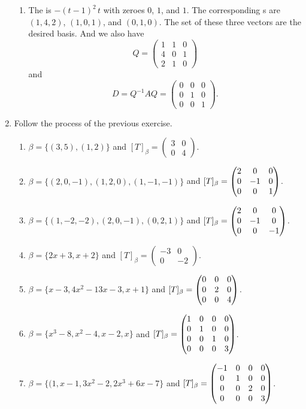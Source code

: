 \begin{enumerate}
\begin{enumerate}
\item The \charpoly{} is $-{\left( t-1\right) }^{2}\,t$ with zeroes $0$, $1$, and $1$. The corresponding \egve s are $(1,4,2)$, $(1,0,1)$, and $(0,1,0)$. The set of these three vectors are the desired basis. And we also have 
\[Q=\begin{pmatrix}1&1&0\\4&0&1\\2&1&0\end{pmatrix}\]
and 
\[D=Q^{-1}AQ=\begin{pmatrix}0&0&0\\0&1&0\\0&0&1\end{pmatrix}.\]
\end{enumerate}
\item Follow the process of the previous exercise.
\begin{enumerate}
\item $\beta =\{(3,5),(1,2)\}$ and $[T]_{\beta }=\begin{pmatrix}3&0\\0&4\end{pmatrix}$.
\item $\beta =\{(2,0,-1),(1,2,0),(1,-1,-1)\}$ and $[T]_{\beta }=\begin{pmatrix}2 & 0 & 0\cr 0 & -1 & 0\cr 0 & 0 & 1\end{pmatrix}$.
\item $\beta =\{(1,-2,-2),(2,0,-1),(0,2,1)\}$ and $[T]_{\beta }=\begin{pmatrix}2 & 0 & 0\cr 0 & -1 & 0\cr 0 & 0 & -1\end{pmatrix}$.
\item $\beta =\{2x+3,x+2\}$ and $[T]_{\beta }=\begin{pmatrix}-3&0\\0&-2\end{pmatrix}$.
\item $\beta =\{x-3,4x^2-13x-3,x+1\}$ and $[T]_{\beta }=\begin{pmatrix}0 & 0 & 0\cr 0 & 2 & 0\cr 0 & 0 & 4\end{pmatrix}$.
\item $\beta =\{x^3-8,x^2-4,x-2,x\}$ and $[T]_{\beta }=\begin{pmatrix}1 & 0 & 0 & 0\cr 0 & 1 & 0 & 0\cr 0 & 0 & 1 & 0\cr 0 & 0 & 0 & 3\end{pmatrix}$.
\item $\beta =\{(1,x-1,3x^2-2,2x^3+6x-7\}$ and $[T]_{\beta }=\begin{pmatrix}-1 & 0 & 0 & 0\cr 0 & 1 & 0 & 0\cr 0 & 0 & 2 & 0\cr 0 & 0 & 0 & 3\end{pmatrix}$.

\end{enumerate}
\end{enumerate}
